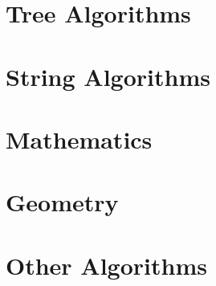 \documentclass[13pt]{article}
\begin{document}
\section{Tree Algorithms}
\section{String Algorithms}
\section{Mathematics}
\section{Geometry}

\section{Other Algorithms}


\end{document}
